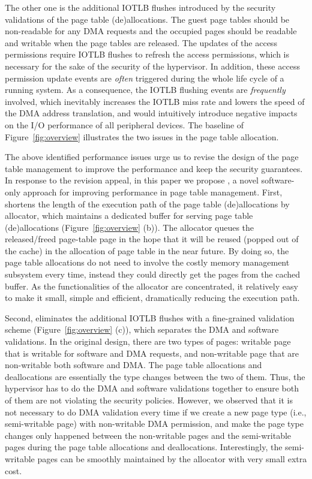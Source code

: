 The other one is the additional IOTLB flushes introduced by the security validations of the page table (de)allocations. 
The guest page tables should be non-readable for any DMA requests and the occupied pages should be readable and writable when the page tables are released. 
The updates of the access permissions require IOTLB flushes to refresh the access permissions, which is necessary for the sake of the security of the hypervisor.
In addition, these access permission update events are \emph{often} triggered during the whole life cycle of a running system.
As a consequence, the IOTLB flushing events are \emph{frequently} involved, which inevitably increases the IOTLB miss rate and lowers the speed of the DMA address translation, and would intuitively introduce negative impacts on the I/O performance of all peripheral devices. 
The baseline of Figure~\ref{fig:overview} illustrates the two issues in the page table allocation.

The above identified performance issues urge us to revise the design of the page table management to improve the performance and keep the security guarantees. 
In response to the revision appeal, in this paper we propose \name, a novel software-only approach for improving performance in page table management. 
First, \name shortens the length of the execution path of the page table (de)allocations by \name allocator, which maintains a dedicated buffer for serving page table (de)allocations (Figure~\ref{fig:overview} (b)).
The \name allocator queues the released/freed page-table page in the hope that 
it will be reused (popped out of the cache) in the allocation of page table in the near future.
By doing so, the page table allocations do not need to involve the costly memory management subsystem every time, instead they could directly get the pages from the cached buffer.
As the functionalities of the \name allocator are concentrated, it relatively easy to make it small, simple and efficient, dramatically reducing the execution path.

Second, \name eliminates the additional IOTLB flushes with a fine-grained validation scheme (Figure~\ref{fig:overview} (c)), which separates the DMA and software validations.
In the original design, there are two types of pages: writable page that is writable for software and DMA requests, and non-writable page that are non-writable both software and DMA.
The page table allocations and deallocations are essentially the type changes between the two of them.
Thus, the hypervisor has to do the DMA and software validations together to ensure both of them are not violating the security policies.
However, we observed that it is not necessary to do DMA validation every time if we create a new page type (i.e., semi-writable page) with non-writable DMA permission, and make the page type changes only happened between the non-writable pages and the semi-writable pages during the page table allocations and deallocations. 
Interestingly, the semi-writable pages can be smoothly maintained by the \name allocator with very small extra cost.

